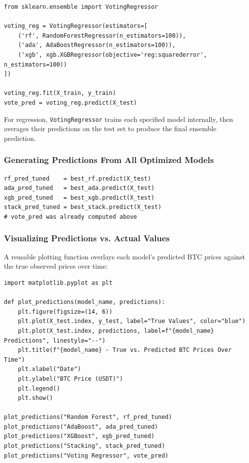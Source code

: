 \documentclass[12pt,openany]{book}
\begin{document}
\begin{Verbatim}[breaklines=true,breakanywhere=true,fontsize=\small]
from sklearn.ensemble import VotingRegressor

voting_reg = VotingRegressor(estimators=[
    ('rf', RandomForestRegressor(n_estimators=100)),
    ('ada', AdaBoostRegressor(n_estimators=100)),
    ('xgb', xgb.XGBRegressor(objective='reg:squarederror', n_estimators=100))
])

voting_reg.fit(X_train, y_train)
vote_pred = voting_reg.predict(X_test)
\end{Verbatim}

For regression, \texttt{VotingRegressor} trains each specified model internally, then averages their predictions on the test set to produce the final ensemble prediction.

\subsubsection{Generating Predictions From All Optimized Models}

\begin{Verbatim}[breaklines=true,breakanywhere=true,fontsize=\small]
rf_pred_tuned    = best_rf.predict(X_test)
ada_pred_tuned   = best_ada.predict(X_test)
xgb_pred_tuned   = best_xgb.predict(X_test)
stack_pred_tuned = best_stack.predict(X_test)
# vote_pred was already computed above
\end{Verbatim}

\subsubsection{Visualizing Predictions vs. Actual Values}

A reusable plotting function overlays each model's predicted BTC prices against the true observed prices over time:

\begin{Verbatim}[breaklines=true,breakanywhere=true,fontsize=\small]
import matplotlib.pyplot as plt

def plot_predictions(model_name, predictions):
    plt.figure(figsize=(14, 6))
    plt.plot(X_test.index, y_test, label="True Values", color="blue")
    plt.plot(X_test.index, predictions, label=f"{model_name} Predictions", linestyle="--")
    plt.title(f"{model_name} - True vs. Predicted BTC Prices Over Time")
    plt.xlabel("Date")
    plt.ylabel("BTC Price (USDT)")
    plt.legend()
    plt.show()

plot_predictions("Random Forest", rf_pred_tuned)
plot_predictions("AdaBoost", ada_pred_tuned)
plot_predictions("XGBoost", xgb_pred_tuned)
plot_predictions("Stacking", stack_pred_tuned)
plot_predictions("Voting Regressor", vote_pred)
\end{Verbatim}
\end{document}
